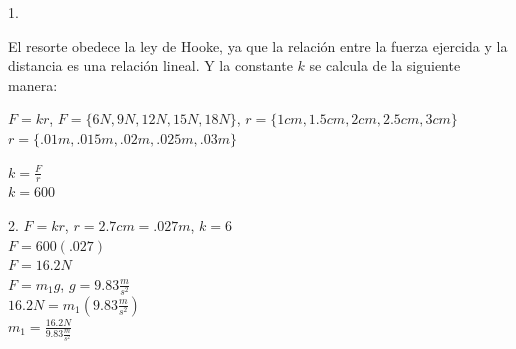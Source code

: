 \documentclass[10pt, a4paper]{article}
\begin{document}
\begin{enumerate}
\begin{enumerate}
            1.
            \begin{center}
            \end{center}
            
            El resorte obedece la ley de Hooke, ya que la relación entre la fuerza ejercida y la 
            distancia es una relación lineal. Y la constante $k$ se calcula de la siguiente manera:

            \begin{center}
                $F = kr$, $F=\{6N,9N,12N,15N,18N\}$, $r=\{1\si{cm},1.5\si{cm},2\si{cm},2.5\si{cm},3\si{cm}\}$\\
                $r=\{.01\si{m},.015\si{m},.02\si{m},.025\si{m},.03\si{m}\}$

                $k= \frac{F}{r}$\\

                $k= 600$

            \end{center}

            \begin{center}
                2. $F = kr$, $r=2.7\si{cm}=.027\si{m}$, $k = 6$\\
                $F = 600(.027)$\\
                $F=16.2\si{N}$\\
                $F=m_1g$, $g=9.83\si{\frac{m}{s^2}}$\\
                $16.2\si{N}=m_1(9.83\si{\frac{m}{s^2}})$\\
                $m_1=\frac{16.2\si{N}}{9.83\si{\frac{m}{s^2}}}$


\end{center}
\end{enumerate}
\end{enumerate}
\end{document}
